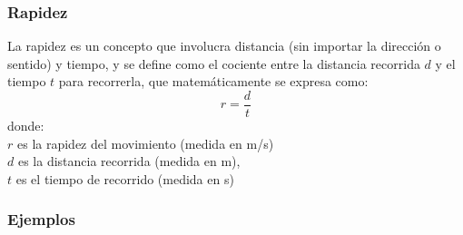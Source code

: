 \documentclass[11pt]{book}
\begin{document}
\subsubsection{Rapidez}
La rapidez es un concepto que involucra distancia (sin importar la dirección o sentido) y tiempo,
y se define como el cociente entre la distancia recorrida $d$ y el tiempo $t$ para recorrerla,
que matemáticamente se expresa como:
\begin{equation}
  r=\frac{d}{t}
\end{equation}
donde:\\
$r$ es la rapidez del movimiento (medida en m/s)\\
$d$ es la distancia recorrida (medida en m),\\
$t$ es el tiempo de recorrido (medida en s)


\subsubsection{Ejemplos}
\end{document}
